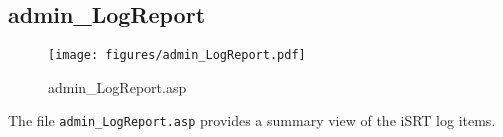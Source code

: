 \subsection{admin\_LogReport}
\begin{figure}[htb]
    \begin{center}
        \texttt{[image: figures/admin\_LogReport.pdf]}
    \end{center}
    \caption{admin\_LogReport.asp}
    \label{fig:admin_LogReport}
\end{figure}

The file \verb|admin_LogReport.asp| provides a summary view of the iSRT log
items.
